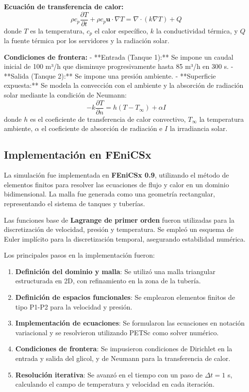 \documentclass[12pt, a4paper]{article}
\begin{document}
\textbf{Ecuación de transferencia de calor:}
\begin{equation}
\rho c_p \frac{\partial T}{\partial t} + \rho c_p \mathbf{u} \cdot \nabla T = \nabla \cdot (k \nabla T) + Q
\end{equation}
donde $T$ es la temperatura, $c_p$ el calor específico, $k$ la conductividad térmica, y $Q$ la fuente térmica por los servidores y la radiación solar.

\textbf{Condiciones de frontera:}
- **Entrada (Tanque 1):** Se impone un caudal inicial de 100 m³/h que disminuye progresivamente hasta 85 m³/h en 300 s.
- **Salida (Tanque 2):** Se impone una presión ambiente.
- **Superficie expuesta:** Se modela la convección con el ambiente y la absorción de radiación solar mediante la condición de Neumann:
  \begin{equation}
  - k \frac{\partial T}{\partial n} = h(T - T_{\infty}) + \alpha I
  \end{equation}
  donde $h$ es el coeficiente de transferencia de calor convectivo, $T_{\infty}$ la temperatura ambiente, $\alpha$ el coeficiente de absorción de radiación e $I$ la irradiancia solar.

\subsection*{Implementación en FEniCSx}

La simulación fue implementada en \textbf{FEniCSx 0.9}, utilizando el método de elementos finitos para resolver las ecuaciones de flujo y calor en un dominio bidimensional. La malla fue generada como una geometría rectangular, representando el sistema de tanques y tuberías.

Las funciones base de \textbf{Lagrange de primer orden} fueron utilizadas para la discretización de velocidad, presión y temperatura. Se empleó un esquema de Euler implícito para la discretización temporal, asegurando estabilidad numérica.

Los principales pasos en la implementación fueron:

\begin{enumerate}
\item \textbf{Definición del dominio y malla}: Se utilizó una malla triangular estructurada en 2D, con refinamiento en la zona de la tubería.
\item \textbf{Definición de espacios funcionales}: Se emplearon elementos finitos de tipo P1-P2 para la velocidad y presión.
\item \textbf{Implementación de ecuaciones}: Se formularon las ecuaciones en notación variacional y se resolvieron utilizando PETSc como solver numérico.
\item \textbf{Condiciones de frontera}: Se impusieron condiciones de Dirichlet en la entrada y salida del glicol, y de Neumann para la transferencia de calor.
\item \textbf{Resolución iterativa}: Se avanzó en el tiempo con un paso de $\Delta t = 1$ s, calculando el campo de temperatura y velocidad en cada iteración.
\end{enumerate}
\end{document}
